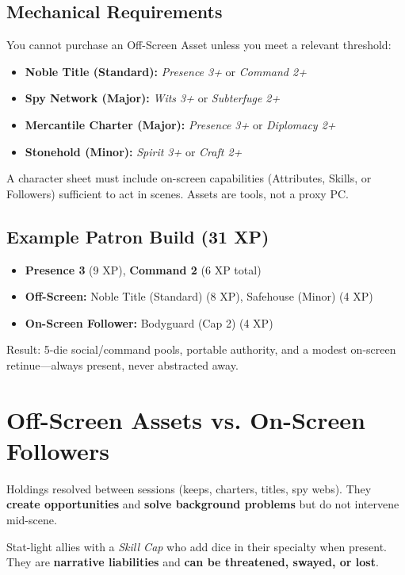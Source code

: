 \documentclass[12pt]{article}
\begin{document}
\subsection{Mechanical Requirements}
\begin{description}[leftmargin=2cm]
  \item[Face Requirement] You cannot purchase an Off-Screen Asset unless you meet a relevant threshold:
    \begin{itemize}
      \item \textbf{Noble Title (Standard):} \textit{Presence 3+} or \textit{Command 2+}
      \item \textbf{Spy Network (Major):} \textit{Wits 3+} or \textit{Subterfuge 2+}
      \item \textbf{Mercantile Charter (Major):} \textit{Presence 3+} or \textit{Diplomacy 2+}
      \item \textbf{Stonehold (Minor):} \textit{Spirit 3+} or \textit{Craft 2+}
    \end{itemize}
  \item[No Empty Chair] A character sheet must include on-screen capabilities (Attributes, Skills, or Followers) sufficient to act in scenes. Assets are tools, not a proxy PC.
\end{description}

\subsection{Example Patron Build (31 XP)}
\begin{itemize}
  \item \textbf{Presence 3} (9 XP), \textbf{Command 2} (6 XP total)
  \item \textbf{Off-Screen:} Noble Title (Standard) (8 XP), Safehouse (Minor) (4 XP)
  \item \textbf{On-Screen Follower:} Bodyguard (Cap 2) (4 XP)
\end{itemize}
\noindent
Result: 5-die social/command pools, portable authority, and a modest on-screen retinue—always present, never abstracted away.

\section{Off-Screen Assets vs. On-Screen Followers}
\begin{description}[leftmargin=2cm]
  \item[Off-Screen Assets] Holdings resolved between sessions (keeps, charters, titles, spy webs). They \textbf{create opportunities} and \textbf{solve background problems} but do not intervene mid-scene.
  \item[On-Screen Followers] Stat-light allies with a \textit{Skill Cap} who add dice in their specialty when present. They are \textbf{narrative liabilities} and \textbf{can be threatened, swayed, or lost}.
\end{description}
\end{document}
